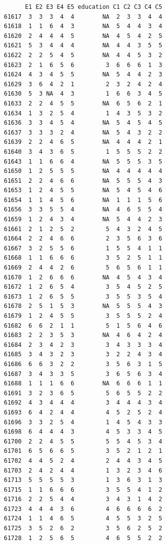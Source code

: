 \documentclass[
  letterpaper,
  DIV=11,
  numbers=noendperiod]{scrreprt}
\begin{document}
\begin{verbatim}
      E1 E2 E3 E4 E5 education C1 C2 C3 C4 C5
61617  3  3  3  4  4        NA  2  3  3  4  4
61618  1  1  6  4  3        NA  5  4  4  3  4
61620  2  4  4  4  5        NA  4  5  4  2  5
61621  5  3  4  4  4        NA  4  4  3  5  5
61622  2  2  5  4  5        NA  4  4  5  3  2
61623  2  1  6  5  6         3  6  6  6  1  3
61624  4  3  4  5  5        NA  5  4  4  2  3
61629  3  6  4  2  1         2  3  2  4  2  4
61630  5  3 NA  4  3         1  6  6  3  4  5
61633  2  2  4  5  5        NA  6  5  6  2  1
61634  1  3  2  5  4         1  4  3  5  3  2
61636  3  3  4  5  4        NA  5  4  5  4  5
61637  3  3  3  2  4        NA  5  4  3  2  2
61639  2  2  4  6  5        NA  4  4  4  2  1
61640  3  4  3  6  5         1  5  5  5  2  2
61643  1  1  6  6  4        NA  5  5  5  3  5
61650  1  2  5  5  5        NA  4  4  4  4  4
61651  2  2  4  6  6        NA  5  5  5  4  3
61653  1  2  4  5  5        NA  5  4  5  4  6
61654  1  1  4  5  6        NA  1  1  1  5  6
61656  3  3  5  5  4        NA  4  6  5  5  4
61659  1  2  4  3  4        NA  5  4  4  2  3
61661  2  1  2  5  2         5  4  3  2  4  5
61664  2  2  4  6  6         2  3  5  6  3  6
61667  3  2  5  5  6         1  5  5  4  1  1
61668  1  1  6  6  6         3  5  2  5  1  1
61669  2  4  4  2  6         5  6  5  6  1  1
61670  1  2  6  6  6        NA  4  5  4  3  4
61672  1  2  6  5  4         3  5  4  5  2  5
61673  1  2  6  5  5         3  5  5  3  5  4
61678  2  5  1  5  3        NA  5  5  5  4  3
61679  1  2  4  5  5         3  5  5  5  2  4
61682  6  6  2  1  1         5  1  5  6  4  6
61683  2  2  3  5  3        NA  4  6  4  2  4
61684  2  3  4  2  3         3  4  3  3  3  4
61685  3  4  3  2  3         3  2  2  4  3  4
61686  6  6  3  2  2         3  5  6  3  1  5
61687  3  4  3  3  5         3  6  5  6  3  4
61688  1  1  1  6  6        NA  6  6  6  1  1
61691  3  2  3  6  5         5  6  5  5  2  2
61692  4  3  4  4  4         3  4  4  4  3  4
61693  6  4  2  4  4         4  5  2  5  2  4
61696  3  3  2  5  4         1  4  5  4  3  3
61698  6  4  4  4  3         4  5  3  3  4  5
61700  2  2  4  5  5         5  5  4  5  3  4
61701  6  5  6  6  5         3  5  2  1  2  1
61702  4  4  5  2  4         2  4  4  3  4  5
61703  2  4  2  4  4         1  3  2  3  4  6
61713  5  5  5  5  3         1  3  6  3  1  3
61715  1  1  6  6  6         3  5  5  4  1  2
61716  2  2  5  4  4         3  4  3  1  4  2
61723  4  4  4  3  6         4  6  6  6  6  2
61724  1  1  4  6  5         4  5  5  3  2  5
61725  3  5  2  6  2         3  5  6  2  5  2
61728  1  2  5  6  5         4  6  5  5  2  2

\end{verbatim}
\end{document}
